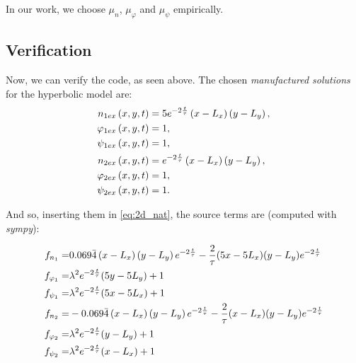 In our work, we choose $\mu_{n}$, $\mu_{\varphi}$ and $\mu_{\psi}$
empirically.

\subsection{Verification}

Now, we can verify the code, as seen above. The chosen \textit{manufactured
solutions} for the hyperbolic model are:
\begin{align*}
n_{1ex}\left(x,y,t\right) & =5e^{\text{\textminus}2\frac{t}{\tau}}\left(x-L_{x}\right)\left(y-L_{y}\right),\\
\varphi_{1ex}\left(x,y,t\right) & =1,\\
\psi_{1ex}\left(x,y,t\right) & =1,\\
n_{2ex}\left(x,y,t\right) & =e^{\text{\textminus}2\frac{t}{\tau}}\left(x-L_{x}\right)\left(y-L_{y}\right),\\
\varphi_{2ex}\left(x,y,t\right) & =1,\\
\psi_{2ex}\left(x,y,t\right) & =1.
\end{align*}

And so, inserting them in \ref{eq:2d_nat}, the source terms are (computed
with \textit{sympy}):

\begin{align*}
f_{n_{1}}= & 0.069\bar{4}\left(x-L_{x}\right)\left(y-L_{y}\right)e^{\text{\textminus}2\frac{t}{\tau}}-\frac{2}{\tau}(5x-5L_{x})(y-L_{y})e^{\text{\textminus}2\frac{t}{\tau}}\\
f_{\varphi_{1}}= & \lambda^{2}e^{\text{\textminus}2\frac{t}{\tau}}(5y-5L_{y})+1\\
f_{\psi_{1}}= & \lambda^{2}e^{\text{\textminus}2\frac{t}{\tau}}(5x-5L_{x})+1\\
f_{n_{2}}= & -0.069\bar{4}\left(x-L_{x}\right)\left(y-L_{y}\right)e^{\text{\textminus}2\frac{t}{\tau}}-\frac{2}{\tau}(x-L_{x})(y-L_{y})e^{\text{\textminus}2\frac{t}{\tau}}\\
f_{\varphi_{2}}= & \lambda^{2}e^{\text{\textminus}2\frac{t}{\tau}}(y-L_{y})+1\\
f_{\psi_{2}}= & \lambda^{2}e^{\text{\textminus}2\frac{t}{\tau}}(x-L_{x})+1
\end{align*}

